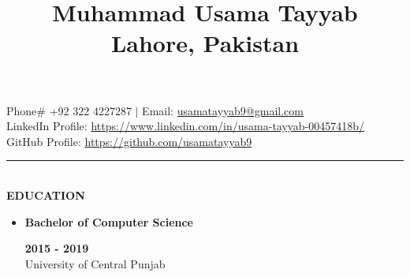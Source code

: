 \documentclass[9pt,a4paper]{article}
\title{
	\textbf{Muhammad Usama Tayyab}\\Lahore, Pakistan
}
\date{}
\author{}
\newcommand{\MyHorizontalLine}{\noindent\rule{\linewidth}{1.5pt}\\}
\begin{document}
	\maketitle
	\begin{center}
		 \raggedright Phone$\#$ +92 322 4227287
		 $\vert$
		 Email: \href{mailto:usamatayyab9@gmail.com}
		 {usamatayyab9@gmail.com}\\
		
		LinkedIn Profile:
		\href{https://www.linkedin.com/in/usama-tayyab-00457418b/}
		{https://www.linkedin.com/in/usama-tayyab-00457418b/}\\
		
		GitHub Profile:
		 \href{https://github.com/usamatayyab9}
		 {https://github.com/usamatayyab9}\\
	\end{center}

\MyHorizontalLine
	\textbf{EDUCATION}
	\begin{itemize}
		\item[]\raggedleft\textbf{Bachelor of Computer Science}\hfill\raggedright\textbf{2015 - 2019}\\
		University of Central Punjab
	\end{itemize}
	
\end{document}
